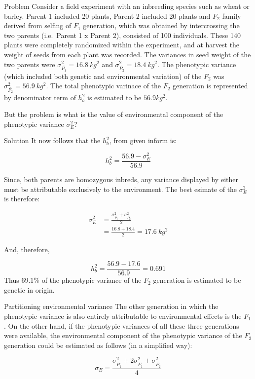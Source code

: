 \documentclass[11pt,dvipsnames,ignorenonframetext,aspectratio=169]{beamer}
\begin{document}
\begin{frame}{Problem}
\protect\hypertarget{problem}{}
Consider a field experiment with an inbreeding species such as wheat or
barley. Parent 1 included 20 plants, Parent 2 included 20 plants and
\(F_2\) family derived from selfing of \(F_1\) generation, which was
obtained by intercrossing the two parents (i.e.~Parent 1 x Parent 2),
consisted of 100 individuals. These 140 plants were completely
randomized within the experiment, and at harvest the weight of seeds
from each plant was recorded. The variances in seed weight of the two
parents were \(\sigma_{\bar{P_1}}^2 = 16.8~kg^2\) and
\(\sigma_{\bar{P_2}}^2 = 18.4~kg^2\). The phenotypic variance (which
included both genetic and environmental variation) of the \(F_2\) was
\(\sigma_{\bar{F_2}}^2 = 56.9~kg^2\). The total phenotypic varinace of
the \(F_2\) generation is represented by denominator term of \(h_b^2\)
is estimated to be \(56.9 kg^2\).

But the problem is what is the value of environmental component of the
phenotypic variance \(\sigma_E^2\)?
\end{frame}

\begin{frame}{Solution}
\protect\hypertarget{solution-1}{}
It now follows that the \(h_b^2\), from given inform is:

\[
h_b^2 = \frac{56.9-\sigma_E^2}{56.9}
\]

Since, both parents are homozygous inbreds, any variance displayed by
either must be attributable exclusively to the environment. The best
esimate of the \(\sigma_E^2\) is therefore:

\[
\begin{aligned}
\sigma_E^2 &= \frac{\sigma_{\bar{P_1}}^2 + \sigma_{\bar{P_2}}^2}{2} \\
&= \frac{16.8 + 18.4}{2} = 17.6~kg^2
\end{aligned}
\]
\end{frame}

\begin{frame}{}
\protect\hypertarget{section-18}{}
And, therefore,

\[
h_b^2=\frac{56.9-17.6}{56.9} = 0.691
\] Thus 69.1\% of the phenotypic variance of the \(F_2\) generation is
estimated to be genetic in origin.
\end{frame}

\begin{frame}{Partitioning environmental variance}
\protect\hypertarget{partitioning-environmental-variance}{}
The other generation in which the phenotypic variance is also entirely
attributable to environmental effects is the \(F_1\). On the other hand,
if the phenotypic variances of all these three generations were
available, the environmental component of the phenotypic variance of the
\(F_2\) generation could be estimated as follows (in a simplified way):

\[
\sigma_E = \frac{\sigma_{\bar{P_1}}^2 + 2\sigma_{\bar{F_1}}^2 + \sigma_{\bar{P_2}}^2}{4}
\tag{iv}
\]
\end{frame}
\end{document}

